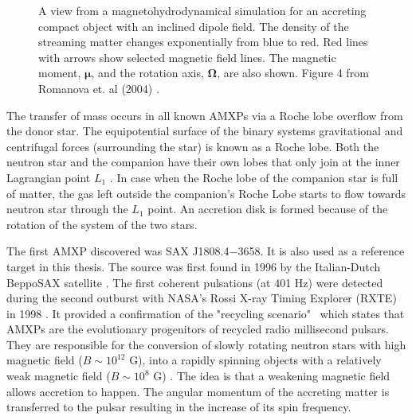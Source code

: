 \documentclass{wihuri}
\def\source{SAX J1808.4$-$3658}
\newcommand{\bmath}[1]{\boldsymbol{#1}}
\begin{document}
\begin{figure}
\centerline{} 
\caption{A view from a magnetohydrodynamical simulation for an accreting compact object with an inclined dipole field. The density of the streaming matter changes exponentially from blue to red. Red lines with arrows show selected magnetic field lines. The magnetic moment, $\bmath{\mu}$, and the rotation axis, $\bmath{\Omega}$, are also shown. Figure 4 from Romanova et. al (2004) \cite{romanova}.} 
\label{fig:shcematic}
\end{figure}

The transfer of mass occurs in all known AMXPs via a Roche lobe overflow from the donor star. The equipotential surface of the binary systems gravitational and centrifugal forces (surrounding the star) is known as a Roche lobe. Both the neutron star and the companion have their own lobes that only join at the inner Lagrangian point $L_{1}$ \cite{frank85}. %
In case when the Roche lobe of the companion star is full of matter, the gas left outside the companion's Roche Lobe starts to flow towards neutron star through the  $L_{1}$ point. An accretion disk is formed because of the rotation of the system of the two stars.
 

The first AMXP discovered was \source. It is also used as a reference target in this thesis. %
The source was first found in 1996 by the Italian-Dutch BeppoSAX satellite \cite{zandsax1808}. %
The first coherent pulsations (at 401 Hz) were detected during the second outburst with NASA's Rossi X-ray Timing Explorer (RXTE) in 1998 \cite{wijnandssax1808}. %
It provided a confirmation of the "recycling scenario" \ which states that AMXPs are the evolutionary progenitors of recycled radio millisecond pulsars. They are responsible for the conversion of slowly rotating neutron stars with high magnetic field ($B \sim 10^{12}$ G), into a rapidly spinning objects with a relatively weak magnetic field ($B \sim 10^{8}$ G) \cite{patruno}. The idea is that a weakening magnetic field allows accretion to happen. The angular momentum of the accreting matter is transferred to the pulsar resulting in the increase of its spin frequency.%
\end{document}
